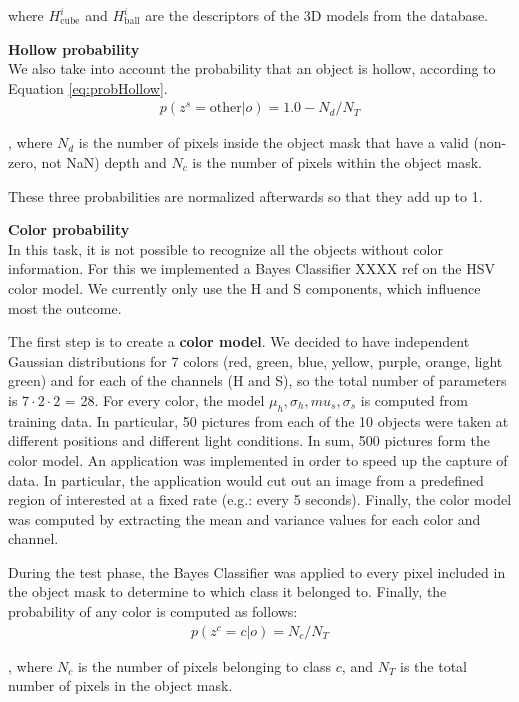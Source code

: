 where $H_{\text{cube}}^i$ and $H_{\text{ball}}^i$ are the descriptors of the 3D models from the database.

\textbf{Hollow probability}\\
We also take into account the probability that an object is hollow, according to Equation \ref{eq:probHollow}.
\begin{align}
\label{eq:probHollow}
p(z^s = \text{other} | o) = 1.0 - N_d/N_T
\end{align}

, where $N_d$ is the number of pixels inside the object mask that have a valid (non-zero, not NaN) depth and $N_c$ is the number of pixels within the object mask.

These three probabilities are normalized afterwards so that they add up to 1.

\textbf{Color probability}\\
In this task, it is not possible to recognize all the objects without color information. For this we implemented a Bayes Classifier XXXX ref on the HSV color model. We currently only use the H and S components, which influence most the outcome. 

The first step is to create a \textbf{color model}. We decided to have independent Gaussian distributions for 7 colors (red, green, blue, yellow, purple, orange, light green) and for each of the channels (H and S), so the total number of parameters is $7 \cdot 2 \cdot 2$ = 28. For every color, the model ${\mu_h, \sigma_h, mu_s, \sigma_s}$ is computed from training data. In particular, 50 pictures from each of the 10 objects were taken at different positions and different light conditions. In sum, 500 pictures form the color model. An application was implemented in order to speed up the capture of data. In particular, the application would cut out an image from a predefined region of interested at a fixed rate (e.g.: every 5 seconds). Finally, the color model was computed by extracting the mean and variance values for each color and channel.

During the test phase, the Bayes Classifier was applied to every pixel included in the object mask to determine to which class it belonged to. Finally, the probability of any color is computed as follows:
\begin{align}
p(z^c = c | o ) = N_c / N_T
\end{align}

, where $N_c$ is the number of pixels belonging to class $c$, and $N_T$ is the total number of pixels in the object mask. 


